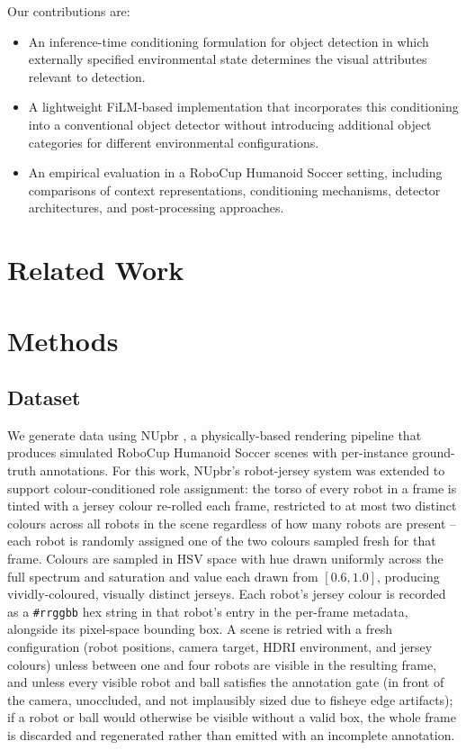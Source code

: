\documentclass{article}
\begin{document}
Our contributions are:

\begin{itemize}
    \item An inference-time conditioning formulation for object detection in which
    externally specified environmental state determines the visual attributes
    relevant to detection.
    
    \item A lightweight FiLM-based implementation that incorporates this
    conditioning into a conventional object detector without introducing
    additional object categories for different environmental configurations.
    
    \item An empirical evaluation in a RoboCup Humanoid Soccer setting, including
    comparisons of context representations, conditioning mechanisms, detector
    architectures, and post-processing approaches.
\end{itemize}

\section{Related Work}


\section{Methods}

\subsection{Dataset}

We generate data using NUpbr \cite{sims2024nupbr}, a physically-based rendering pipeline that produces simulated RoboCup Humanoid Soccer scenes with per-instance ground-truth annotations. For this work, NUpbr's robot-jersey system was extended to support colour-conditioned role assignment: the torso of every robot in a frame is tinted with a jersey colour re-rolled each frame, restricted to at most two distinct colours across all robots in the scene regardless of how many robots are present -- each robot is randomly assigned one of the two colours sampled fresh for that frame. Colours are sampled in HSV space with hue drawn uniformly across the full spectrum and saturation and value each drawn from $[0.6, 1.0]$, producing vividly-coloured, visually distinct jerseys. Each robot's jersey colour is recorded as a \texttt{\#rrggbb} hex string in that robot's entry in the per-frame metadata, alongside its pixel-space bounding box. A scene is retried with a fresh configuration (robot positions, camera target, HDRI environment, and jersey colours) unless between one and four robots are visible in the resulting frame, and unless every visible robot and ball satisfies the annotation gate (in front of the camera, unoccluded, and not implausibly sized due to fisheye edge artifacts); if a robot or ball would otherwise be visible without a valid box, the whole frame is discarded and regenerated rather than emitted with an incomplete annotation.
\end{document}
